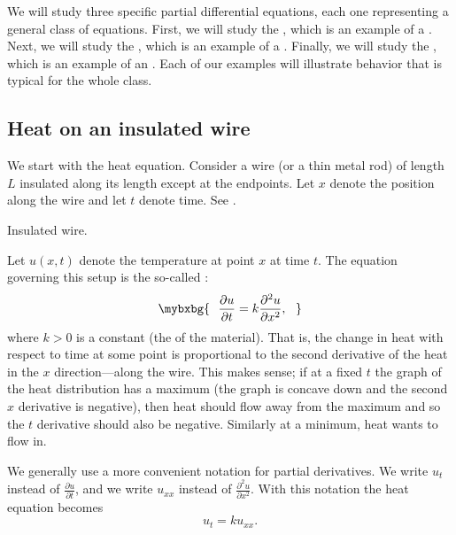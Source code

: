 We will study three specific
partial differential equations, each one representing a
general class of equations.  First, we will study the
\emph{}, which is an example of
a \emph{}.  Next, we will study the
\emph{}, which is an example of
a \emph{}.  Finally, we will study the
\emph{}, which is an example of
an \emph{}.  Each of our examples will illustrate
behavior that is typical for the whole class.

\subsection{Heat on an insulated wire}

We start with the heat equation.
Consider a wire (or a thin metal rod) of length $L$
insulated along its length
except at the endpoints.
Let $x$ denote the position along the wire and let $t$ denote time.
See .

\begin{myfig}
\capstart
{}
\caption{Insulated wire.\label{heat:wirefig}}
\end{myfig}

Let $u(x,t)$ denote the temperature at point $x$ at time $t$.
The equation governing this setup is the
so-called \emph{}:
\begin{equation*}
\mybxbg{~~
\frac{\partial u}{\partial t} =
k \frac{\partial^2 u}{\partial x^2} ,
~~}
\end{equation*}
where $k > 0$ is a constant (the \emph{} of the material).
That is, the change in heat with respect to time at some point
is proportional to the second
derivative of the heat in the $x$ direction---along the wire.
This makes sense;
if at a fixed $t$
the graph of the heat distribution has a maximum
(the graph is concave down and the second $x$ derivative is negative),
then heat should flow away from the maximum and so the $t$ derivative should also
be negative.
Similarly at a minimum, heat wants to flow in.

We generally use a more convenient notation for partial derivatives.
We write $u_t$ instead of $\frac{\partial u}{\partial t}$,
and we write $u_{xx}$ instead of $\frac{\partial^2 u}{\partial x^2}$.
With this notation the heat equation becomes
\begin{equation*}
u_t = k u_{xx} .
\end{equation*}

